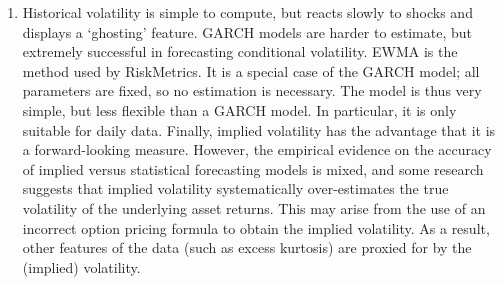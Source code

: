 \documentclass[11pt,a4paper]{article}
\begin{document}
\begin{enumerate}
\begin{enumerate}
\item Historical volatility is simple to compute, but reacts slowly to shocks and displays a `ghosting' feature. GARCH models are harder to estimate, but extremely successful in forecasting conditional volatility. EWMA is the method used by RiskMetrics. It is a special case of the GARCH model; all parameters are fixed, so no estimation is necessary. The model is thus very simple, but less flexible than a GARCH model. In particular, it is only suitable for daily data. Finally, implied volatility has the advantage that it is a forward-looking measure. However, the empirical evidence on the accuracy of implied versus statistical forecasting models is mixed, and some research suggests that implied volatility systematically over-estimates the true volatility of the underlying asset returns. This may arise from the use of an incorrect option pricing formula to obtain the implied volatility. As a result, other features of the data (such as excess kurtosis) are proxied for by the (implied) volatility.

\end{enumerate}
\end{enumerate}
\newpage
\end{document}
